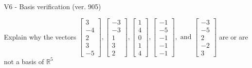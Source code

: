 \begin{exercise}
  \begin{exerciseTitle}V6 - Basis verification (ver. 905)\end{exerciseTitle}
  \begin{exerciseStatement}
    Explain why the vectors \(\left[\begin{array}{r}
3 \\
-4 \\
2 \\
3 \\
-5
\end{array}\right] , \left[\begin{array}{r}
-3 \\
-3 \\
1 \\
3 \\
2
\end{array}\right] , \left[\begin{array}{r}
1 \\
4 \\
0 \\
1 \\
4
\end{array}\right] , \left[\begin{array}{r}
-1 \\
-5 \\
-1 \\
-1 \\
-1
\end{array}\right] , \text{ and } \left[\begin{array}{r}
-3 \\
-5 \\
2 \\
-2 \\
3
\end{array}\right]\) are or are not a basis of \(\mathbb{R}^5\)	



\end{exerciseStatement}
\end{exercise}
